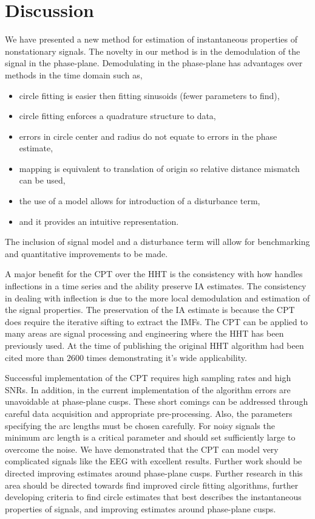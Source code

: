 \documentclass[journal,11pt,a4paper,onecolumn,draftcls]{IEEEtran}
\begin{document}
\section{Discussion}\label{sect:DiscussionSection}
We have presented a new method for estimation of instantaneous properties of nonstationary signals. The novelty in our method is in the demodulation of the signal in the phase-plane. Demodulating in the phase-plane has advantages over methods in the time domain such as, 
\begin{itemize}
    \item circle fitting is easier then fitting sinusoids (fewer parameters to find),
    \item circle fitting enforces a quadrature structure to data,
    \item errors in circle center and radius do not equate to errors in the phase estimate,
    \item mapping is equivalent to translation of origin so relative distance mismatch can be used,
    \item the use of a model allows for introduction of a disturbance term,
    \item and it provides an intuitive representation.
\end{itemize}
The inclusion of signal model and a disturbance term will allow for benchmarking and quantitative improvements to be made.

A major benefit for the CPT over the HHT is the consistency with how handles inflections in a time series and the ability preserve IA estimates. The consistency in dealing with inflection is due to the more local demodulation and estimation of the signal properties. The preservation of the IA estimate is because the CPT does require the iterative sifting to extract the IMFs. The CPT can be applied to many areas are signal processing and engineering where the HHT has been previously used. At the time of publishing the original HHT algorithm had been cited more than $2600$ times demonstrating it's wide applicability.

Successful implementation of the CPT requires high sampling rates and high SNRs. In addition, in the current implementation of the algorithm errors are unavoidable at phase-plane cusps. These short comings can be addressed through careful data acquisition and appropriate pre-processing. Also, the parameters specifying the arc lengths must be chosen carefully. For noisy signals the minimum arc length is a critical parameter and should set sufficiently large to overcome the noise. We have demonstrated that the CPT can model very complicated signals like the EEG with excellent results. Further work should be directed improving estimates around phase-plane cusps.
Further research in this area should be directed towards find improved circle fitting algorithms, further developing criteria to find circle estimates that best describes the instantaneous properties of signals, and improving estimates around phase-plane cusps.
\end{document}
